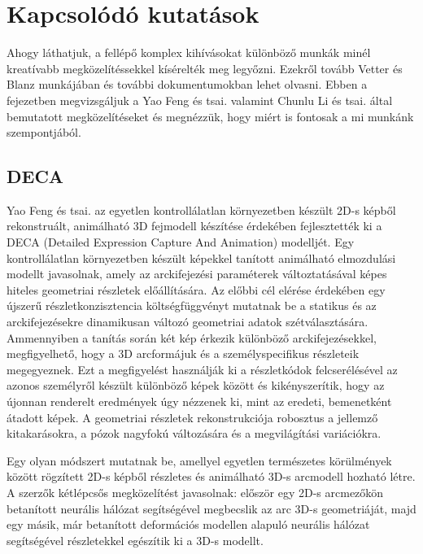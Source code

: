 \documentclass[12pt,a4]{article}
\begin{document}
    
    
    \section{Kapcsolódó kutatások}

        Ahogy láthatjuk, a fellépő komplex kihívásokat különböző munkák minél kreatívabb megközelítéssekkel kísérelték meg legyőzni. Ezekről tovább \cite{blanzvetter}Vetter és Blanz  munkájában és további dokumentumokban lehet olvasni. Ebben a fejezetben megvizsgáljuk a \cite{deca}Yao Feng és tsai. valamint \cite{focus}Chunlu Li és tsai. által bemutatott megközelítéseket és megnézzük, hogy miért is fontosak a mi munkánk szempontjából.

        \subsection{DECA} \label{DECA}
 	
            \cite{deca}Yao Feng és tsai. az egyetlen kontrollálatlan környezetben készült 2D-s képből rekonstruált, animálható 3D fejmodell készítése érdekében fejlesztették ki a DECA (Detailed Expression Capture And Animation) modelljét. Egy kontrollálatlan környezetben készült képekkel tanított animálható elmozdulási modellt javasolnak, amely az arckifejezési paraméterek változtatásával képes hiteles geometriai részletek előállítására. Az előbbi cél elérése érdekében egy újszerű részletkonzisztencia költségfüggvényt mutatnak be a statikus és az arckifejezésekre dinamikusan változó geometriai adatok szétválasztására. Ammennyiben a tanítás során két kép érkezik különböző arckifejezésekkel, megfigyelhető, hogy a 3D arcformájuk és a személyspecifikus részleteik megegyeznek. Ezt a megfigyelést használják ki a részletkódok felcserélésével az azonos személyről készült különböző képek között és kikényszerítik, hogy az újonnan renderelt eredmények úgy nézzenek ki, mint az eredeti, bemenetként átadott képek. A geometriai részletek rekonstrukciója robosztus a jellemző kitakarásokra, a pózok nagyfokú változására és a megvilágítási variációkra.
    
            Egy olyan módszert mutatnak be, amellyel egyetlen természetes körülmények között rögzített 2D-s képből részletes és animálható 3D-s arcmodell hozható létre. A szerzők kétlépcsős megközelítést javasolnak: először egy 2D-s arcmezőkön betanított neurális hálózat segítségével megbecslik az arc 3D-s geometriáját, majd egy másik, már betanított deformációs modellen alapuló neurális hálózat segítségével részletekkel egészítik ki a 3D-s modellt.
    
\end{document}
